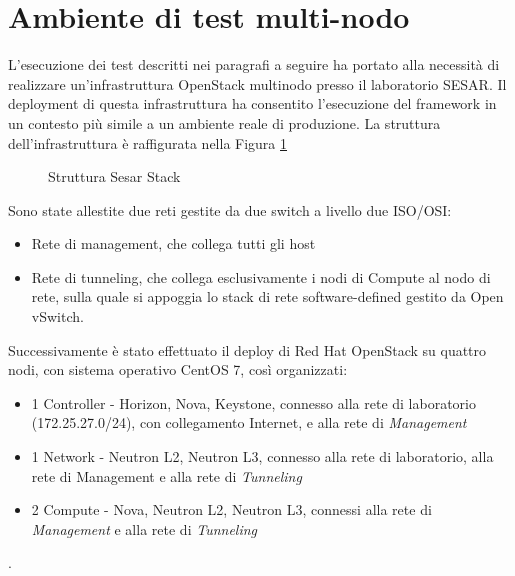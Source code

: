 \documentclass[../main.tex]{subfiles}
\begin{document}
\section{Ambiente di test multi-nodo}
L'esecuzione dei test descritti nei paragrafi a seguire ha portato alla necessità di realizzare un'infrastruttura OpenStack multinodo presso il laboratorio SESAR.
Il deployment di questa infrastruttura ha consentito l'esecuzione del framework in un contesto più simile a un ambiente reale di produzione.
La struttura dell'infrastruttura è raffigurata nella Figura \ref{SesarStack}
\begin{figure}[H]
\centering
{}
\caption{Struttura Sesar Stack}\label{SesarStack}
\end{figure}
Sono state allestite due reti gestite da due switch a livello due ISO/OSI:
\begin{itemize}
\item Rete di management, che collega tutti gli host
\item Rete di tunneling, che collega esclusivamente i nodi di Compute al nodo di rete, sulla quale si appoggia lo stack di rete software-defined gestito da Open vSwitch.
\end{itemize}
Successivamente è stato effettuato il deploy di Red Hat OpenStack su quattro nodi, con sistema operativo CentOS 7, così organizzati:
\begin{itemize}
\item 1 Controller - Horizon, Nova, Keystone, connesso alla rete di laboratorio (172.25.27.0/24), con collegamento Internet,  e alla rete di \textit{Management}
\item 1 Network - Neutron L2, Neutron L3, connesso alla rete di laboratorio, alla rete di Management e alla rete di \textit{Tunneling}
\item 2 Compute - Nova, Neutron L2, Neutron L3, connessi alla rete di \textit{Management} e alla rete di \textit{Tunneling}
\end{itemize}.
\end{document}
